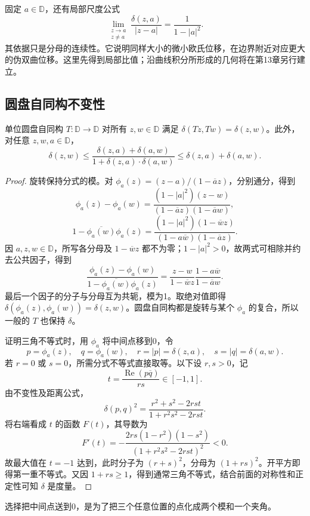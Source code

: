 \ProseParagraphBreak

固定 \(a\in\mathbb D\)，还有局部尺度公式
\[
 \lim_{\substack{z\to a\\z\ne a}}
 \frac{\delta(z,a)}{|z-a|}
 =\frac1{1-|a|^2}.
\]
其依据只是分母的连续性。它说明同样大小的微小欧氏位移，在边界附近对应更大的伪双曲位移。这里先得到局部比值；沿曲线积分所形成的几何将在第13章另行建立。

\subsection{圆盘自同构不变性}
\label{b3:subsec:060202}

\begin{proposition}\label{b3:prop:06-mobius-invariance}
单位圆盘自同构 \(T:\mathbb D\to\mathbb D\) 对所有 \(z,w\in\mathbb D\) 满足 \(\delta(Tz,Tw)=\delta(z,w)\)。此外，对任意 \(z,w,a\in\mathbb D\)，
\[
 \delta(z,w)\le\frac{\delta(z,a)+\delta(a,w)}{1+\delta(z,a)\cdot\delta(a,w)}
 \le\delta(z,a)+\delta(a,w).
\]
\end{proposition}
\begin{proof}
旋转保持分式的模。对 \(\phi_a(z)=(z-a)/(1-\overline a z)\)，分别通分，得到
\[
 \phi_a(z)-\phi_a(w)
 =\frac{(1-|a|^2)(z-w)}{(1-\overline a z)(1-\overline a w)},
\]
\[
 1-\overline{\phi_a(w)}\phi_a(z)
 =\frac{(1-|a|^2)(1-\overline w z)}
 {(1-a\overline w)(1-\overline a z)}.
\]
因 \(a,z,w\in\mathbb D\)，所写各分母及 \(1-\overline w z\) 都不为零；\(1-|a|^2>0\)，故两式可相除并约去公共因子，得到
\[
 \frac{\phi_a(z)-\phi_a(w)}
 {1-\overline{\phi_a(w)}\phi_a(z)}
 =\frac{z-w}{1-\overline w z}
   \frac{1-a\overline w}{1-\overline a w}.
\]
最后一个因子的分子与分母互为共轭，模为1。取绝对值即得 \(\delta(\phi_a(z),\phi_a(w))=\delta(z,w)\)。圆盘自同构都是旋转与某个 \(\phi_a\) 的复合，所以一般的 \(T\) 也保持 \(\delta\)。

证明三角不等式时，用 \(\phi_a\) 将中间点移到0，令
\[
 p=\phi_a(z),\quad q=\phi_a(w),\quad
 r=|p|=\delta(z,a),\quad s=|q|=\delta(a,w).
\]
若 \(r=0\) 或 \(s=0\)，所需分式不等式直接取等。以下设 \(r,s>0\)，记
\[
 t=\frac{\operatorname{Re}(p\overline q)}{rs}\in[-1,1].
\]
由不变性及距离公式，
\[
 \delta(p,q)^2=\frac{r^2+s^2-2rst}{1+r^2s^2-2rst}.
\]
将右端看成 \(t\) 的函数 \(F(t)\)，其导数为
\[
 F'(t)=
 -\frac{2rs(1-r^2)(1-s^2)}
 {(1+r^2s^2-2rst)^2}<0.
\]
故最大值在 \(t=-1\) 达到，此时分子为 \((r+s)^2\)，分母为 \((1+rs)^2\)。开平方即得第一重不等式。又因 \(1+rs\ge1\)，得到通常三角不等式，结合前面的对称性和正定性可知 \(\delta\) 是度量。
\end{proof}
选择把中间点送到0，是为了把三个任意位置的点化成两个模和一个夹角。

